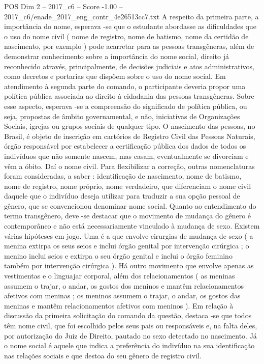 \begin{textsample}{POS Dim 2 – 2017\_c6 – Score -1.00 – 2017\_c6/enade\_2017\_eng\_contr\_4e26513cc7.txt}
A respeito da primeira parte, a importância do nome, esperava -se que o estudante abordasse as dificuldades que o uso do nome civil ( nome de registro, nome de batismo, nome da certidão de nascimento, por exemplo ) pode acarretar para as pessoas transgêneras, além de demonstrar conhecimento sobre a importância do nome social, direito já reconhecido através, principalmente, de decisões judiciais e atos administrativos, como decretos e portarias que dispõem sobre o uso do nome social.
Em atendimento à segunda parte do comando, o participante deveria propor uma política pública associada ao direito à cidadania das pessoas transgêneras.
Sobre esse aspecto, esperava -se a compreensão do significado de política pública, ou seja, propostas de âmbito governamental, e não, iniciativas de Organizações Sociais, igrejas ou grupos sociais de qualquer tipo.
O nascimento das pessoas, no Brasil, é objeto de inscrição em cartórios de Registro Civil das Pessoas Naturais, órgão responsável por estabelecer a certificação pública dos dados de todos os indivíduos que não somente nascem, mas casam, eventualmente se divorciam e vêm a óbito.
Daí o nome civil.
Para flexibilizar a correção, outras nomenclaturas foram consideradas, a saber : identificação de nascimento, nome de batismo, nome de registro, nome próprio, nome verdadeiro, que diferenciam o nome civil daquele que o indivíduo deseja utilizar para traduzir a sua opção pessoal de gênero, que se convencionou denominar nome social.
Quanto ao entendimento do termo transgênero, deve -se destacar que o movimento de mudança do gênero é contemporâneo e não está necessariamente vinculado à mudança de sexo.
Existem várias hipóteses em jogo.
Uma é a que envolve cirurgias de mudança de sexo ( a menina extirpa os seus seios e inclui órgão genital por intervenção cirúrgica ; o menino inclui seios e extirpa o seu órgão genital e inclui o órgão feminino também por intervenção cirúrgica ).
Há outro movimento que envolve apenas as vestimentas e o linguajar corporal, além dos relacionamentos ( as meninas assumem o trajar, o andar, os gostos dos meninos e mantêm relacionamentos afetivos com meninas ; os meninos assumem o trajar, o andar, os gostos das meninas e mantêm relacionamentos afetivos com meninos ).
Em relação à discussão da primeira solicitação do comando da questão, destaca -se que todos têm nome civil, que foi escolhido pelos seus pais ou responsáveis e, na falta deles, por autorização do Juiz de Direito, pautado no sexo detectado no nascimento.
Já o nome social é aquele que indica a preferência do indivíduo na sua identificação nas relações sociais e que destoa do seu gênero de registro civil.

\end{textsample}

